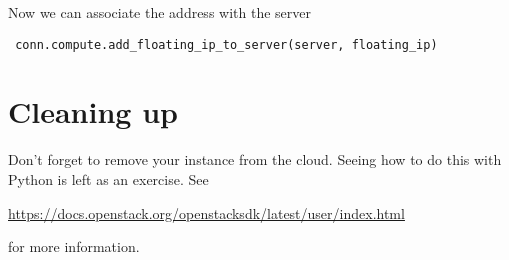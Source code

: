 \documentclass{article}
\begin{document}
Now we can associate the address with the server

\begin{verbatim}
 conn.compute.add_floating_ip_to_server(server, floating_ip)
\end{verbatim}

\section{Cleaning up}
Don't forget to remove your instance from the cloud. Seeing how to do this with Python is left as an exercise. See

\url{https://docs.openstack.org/openstacksdk/latest/user/index.html}

for more information.
\end{document}
